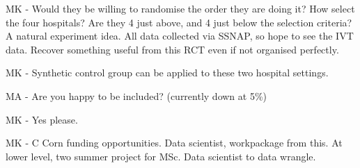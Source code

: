 MK - Would they be willing to randomise the order they are doing it? How select the four hospitals? Are they 4 just above, and 4 just below the selection criteria? A natural experiment idea. All data collected via SSNAP, so hope to see the IVT data. Recover something useful from this RCT even if not organised perfectly.

MK - Synthetic control group can be applied to these two hospital settings.

MA - Are you happy to be included? (currently down at 5\%)

MK - Yes please.

MK - C Corn funding opportunities. Data scientist, workpackage from this. At lower level, two summer project for MSc. Data scientist to data wrangle.
